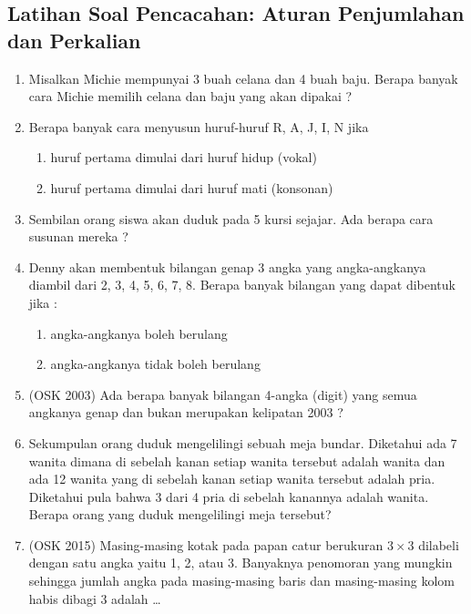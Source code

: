 \subsection{Latihan Soal Pencacahan: Aturan Penjumlahan dan Perkalian}
\begin{enumerate}
    \item Misalkan Michie mempunyai 3 buah celana dan 4 buah baju. Berapa banyak cara Michie memilih celana dan baju yang akan dipakai ?

    \item Berapa banyak cara menyusun huruf-huruf R, A, J, I, N jika 
    \begin{enumerate}
        \item huruf pertama dimulai dari huruf hidup (vokal) 
        \item huruf pertama dimulai dari huruf mati (konsonan) 
    \end{enumerate}

    \item Sembilan orang siswa akan duduk pada 5 kursi sejajar. Ada berapa cara susunan mereka ? 
    
    \item Denny akan membentuk bilangan genap 3 angka yang angka-angkanya diambil dari 2, 3, 4, 5, 6, 7, 8. Berapa banyak bilangan yang dapat dibentuk jika : 
    \begin{enumerate}
        \item angka-angkanya boleh berulang 
        \item angka-angkanya tidak boleh berulang
    \end{enumerate}

    \item (OSK 2003) Ada berapa banyak bilangan 4-angka (digit) yang semua angkanya genap dan bukan merupakan kelipatan 2003 ?

    \item Sekumpulan orang duduk mengelilingi sebuah meja bundar. Diketahui ada 7 wanita dimana di sebelah kanan setiap wanita tersebut adalah wanita dan ada 12 wanita yang di sebelah kanan setiap wanita tersebut adalah pria. Diketahui pula bahwa 3 dari 4 pria di sebelah kanannya adalah wanita. Berapa orang yang duduk mengelilingi meja tersebut?

    \item (OSK 2015) Masing-masing kotak pada papan catur berukuran $3 \times 3$ dilabeli dengan satu angka yaitu 1, 2, atau 3. Banyaknya penomoran yang mungkin sehingga jumlah angka pada masing-masing baris dan masing-masing kolom habis dibagi 3 adalah \ldots
\end{enumerate}